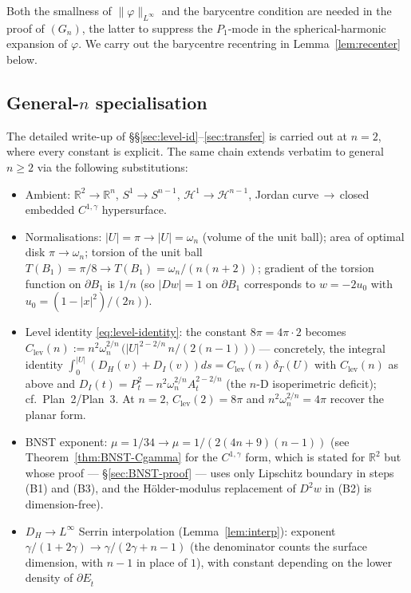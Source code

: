 \documentclass[11pt]{amsart}
\newcommand{\R}{\mathbb R}
\newcommand{\Et}{E_{\hat t}}
\newcommand{\dT}{\delta_T}
\newcommand{\HH}{\mathcal H}
\begin{document}
Both the smallness of $\|\varphi\|_{L^\infty}$ and the barycentre
condition are needed in the proof of $(G_n)$, the latter to suppress
the $P_1$-mode in the spherical-harmonic expansion of $\varphi$.  We
carry out the barycentre recentring in
Lemma~\ref{lem:recenter} below.

\subsection{General-\texorpdfstring{$n$}{n} specialisation}
\label{ss:general-n}

The detailed write-up of \S\S\ref{sec:level-id}--\ref{sec:transfer}
is carried out at $n=2$, where every constant is explicit.  The same
chain extends verbatim to general $n\ge 2$ via the following
substitutions:

\begin{itemize}[leftmargin=2em]
\item Ambient: $\R^2\to\R^n$, $S^1\to S^{n-1}$,
$\HH^1\to\HH^{n-1}$, Jordan curve\,$\to$\,closed embedded
$C^{1,\gamma}$ hypersurface.
\item Normalisations: $|U|=\pi\to|U|=\omega_n$ (volume of the unit
ball); area of optimal disk $\pi\to\omega_n$; torsion of the unit
ball $T(B_1)=\pi/8\to T(B_1)=\omega_n/(n(n+2))$; gradient of the
torsion function on $\partial B_1$ is $1/n$ (so $|Dw|=1$ on
$\partial B_1$ corresponds to $w=-2 u_0$ with $u_0=(1-|x|^2)/(2n)$).
\item Level identity \eqref{eq:level-identity}: the constant
$8\pi=4\pi\cdot 2$ becomes
$C_{\mathrm{lev}}(n):=n^{2}\omega_n^{2/n}\,\bigl(|U|^{2-2/n}\,
n/(2(n-1))\bigr)$ — concretely, the integral identity
$\int_0^{|U|}(D_H(v)+D_I(v))ds=C_{\mathrm{lev}}(n)\,\dT(U)$ with
$C_{\mathrm{lev}}(n)$ as above and $D_I(t)=P_t^2-n^{2}
\omega_n^{2/n} A_t^{2-2/n}$ (the $n$-D isoperimetric deficit);
cf.\ Plan~2/Plan~3.  At $n=2$, $C_{\mathrm{lev}}(2)=8\pi$ and
$n^{2}\omega_n^{2/n}=4\pi$ recover the planar form.
\item BNST exponent: $\mu=1/34\to\mu=1/(2(4n+9)(n-1))$ (see
Theorem~\ref{thm:BNST-Cgamma} for the $C^{1,\gamma}$ form, which is
stated for $\R^2$ but whose proof — \S\ref{sec:BNST-proof} — uses
only Lipschitz boundary in steps (B1) and (B3), and the
Hölder-modulus replacement of $D^2 w$ in (B2) is dimension-free).
\item $D_H\to L^\infty$ Serrin interpolation (Lemma~\ref{lem:interp}):
exponent $\gamma/(1+2\gamma)\to\gamma/(2\gamma+n-1)$ (the
denominator counts the surface dimension, with $n-1$ in place of
$1$), with constant depending on the lower density of $\partial\Et$

\end{itemize}
\end{document}

